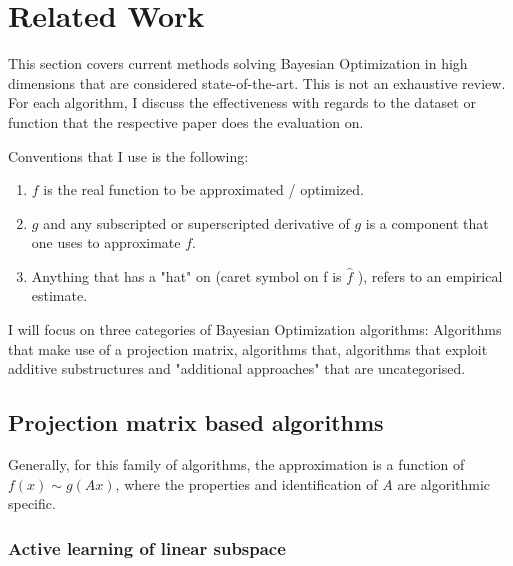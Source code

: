 
\chapter{Related Work}

\ifpdf
    \graphicspath{{04_Chapter2/Figs/Raster/}{04_Chapter2/Figs/PDF/}{04_Chapter2/Figs/}}
\else
    \graphicspath{{04_Chapter2/Figs/Vector/}{04_Chapter2/Figs/}}
\fi

This section covers current methods solving Bayesian Optimization in high dimensions that are considered state-of-the-art.
This is not an exhaustive review. 
For each algorithm, I discuss the effectiveness with regards to the dataset or function that the respective paper does the evaluation on.

Conventions that I use is the following:

\begin{enumerate}
\item $f$ is the real function to be approximated / optimized.
\item $g$ and any subscripted or superscripted derivative of $g$ is a component that one uses to approximate $f$.
\item Anything that has a "hat" on (caret symbol on f is $\hat{f}$ ), refers to an empirical estimate. 
\end{enumerate}

I will focus on three categories of Bayesian Optimization algorithms: Algorithms that make use of a projection matrix, algorithms that, algorithms that exploit additive substructures and "additional approaches" that are uncategorised.

\section{Projection matrix based algorithms}

Generally, for this family of algorithms, the approximation is a function of $f(x) \sim g(Ax)$, where the properties and identification of $A$ are algorithmic specific.

\subsection{Active learning of linear subspace}

